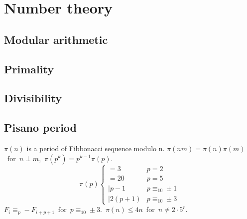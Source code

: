 \chapter{Number theory}

\section{Modular arithmetic}

\section{Primality}

\section{Divisibility}



\section{Pisano period}
	$\pi(n)$ is a period of Fibbonacci sequence modulo n.
	\mbox{$\pi(nm)=\pi(n)\pi(m)$ for $n \perp m$, $\pi(p^k)=p^{k-1}\pi(p)$.}
	\[\pi(p) \left\{
	\begin{array}{ll}
		=3 & p=2\\
		=20 & p=5\\
		\mid p-1 & p\equiv_{10} \pm 1 \\
		\mid 2(p+1) & p\equiv_{10} \pm 3
	\end{array}\right.\]
	\mbox{$F_i \equiv_p -F_{i+p+1}$ for $p\equiv_{10} \pm 3$. $\pi(n) \le 4n$ for $n\neq 2\cdot 5^r$.}


